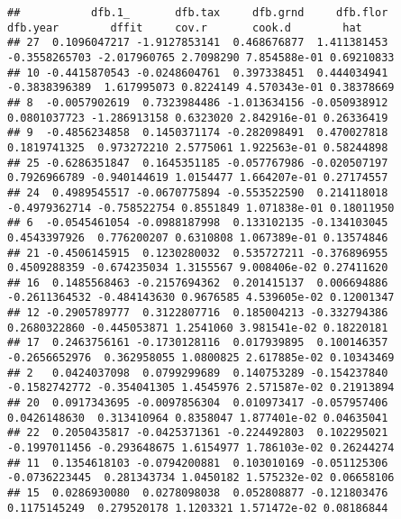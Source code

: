 \documentclass[
]{book}
\newenvironment{Shaded}{\begin{snugshade}}{\end{snugshade}}
\newcommand{\FunctionTok}[1]{\textcolor[rgb]{0.00,0.00,0.00}{#1}}
\newcommand{\NormalTok}[1]{#1}
\newcommand{\SpecialCharTok}[1]{\textcolor[rgb]{0.00,0.00,0.00}{#1}}
\begin{document}
\begin{Shaded}
\end{Shaded}

\begin{verbatim}
##           dfb.1_       dfb.tax     dfb.grnd     dfb.flor      dfb.year        dffit     cov.r       cook.d        hat
## 27  0.1096047217 -1.9127853141  0.468676877  1.411381453 -0.3558265703 -2.017960765 2.7098290 7.854588e-01 0.69210833
## 10 -0.4415870543 -0.0248604761  0.397338451  0.444034941 -0.3838396389  1.617995073 0.8224149 4.570343e-01 0.38378669
## 8  -0.0057902619  0.7323984486 -1.013634156 -0.050938912  0.0801037723 -1.286913158 0.6323020 2.842916e-01 0.26336419
## 9  -0.4856234858  0.1450371174 -0.282098491  0.470027818  0.1819741325  0.973272210 2.5775061 1.922563e-01 0.58244898
## 25 -0.6286351847  0.1645351185 -0.057767986 -0.020507197  0.7926966789 -0.940144619 1.0154477 1.664207e-01 0.27174557
## 24  0.4989545517 -0.0670775894 -0.553522590  0.214118018 -0.4979362714 -0.758522754 0.8551849 1.071838e-01 0.18011950
## 6  -0.0545461054 -0.0988187998  0.133102135 -0.134103045  0.4543397926  0.776200207 0.6310808 1.067389e-01 0.13574846
## 21 -0.4506145915  0.1230280032  0.535727211 -0.376896955  0.4509288359 -0.674235034 1.3155567 9.008406e-02 0.27411620
## 16  0.1485568463 -0.2157694362  0.201415137  0.006694886 -0.2611364532 -0.484143630 0.9676585 4.539605e-02 0.12001347
## 12 -0.2905789777  0.3122807716  0.185004213 -0.332794386  0.2680322860 -0.445053871 1.2541060 3.981541e-02 0.18220181
## 17  0.2463756161 -0.1730128116  0.017939895  0.100146357 -0.2656652976  0.362958055 1.0800825 2.617885e-02 0.10343469
## 2   0.0424037098  0.0799299689  0.140753289 -0.154237840 -0.1582742772 -0.354041305 1.4545976 2.571587e-02 0.21913894
## 20  0.0917343695 -0.0097856304  0.010973417 -0.057957406  0.0426148630  0.313410964 0.8358047 1.877401e-02 0.04635041
## 22  0.2050435817 -0.0425371361 -0.224492803  0.102295021 -0.1997011456 -0.293648675 1.6154977 1.786103e-02 0.26244274
## 11  0.1354618103 -0.0794200881  0.103010169 -0.051125306 -0.0736223445  0.281343734 1.0450182 1.575232e-02 0.06658106
## 15  0.0286930080  0.0278098038  0.052808877 -0.121803476  0.1175145249  0.279520178 1.1203321 1.571472e-02 0.08186844

\end{verbatim}
\end{document}
